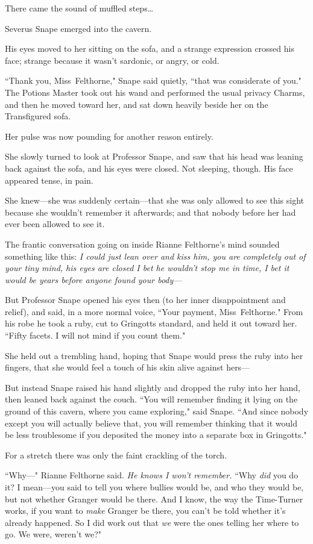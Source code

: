 There came the sound of muffled steps{\ldots}

Severus Snape emerged into the cavern.

His eyes moved to her sitting on the sofa, and a strange expression crossed his face; strange because it wasn't sardonic, or angry, or cold.

``Thank you, Miss~Felthorne," Snape said quietly, ``that was considerate of you." The Potions Master took out his wand and performed the usual privacy Charms, and then he moved toward her, and sat down heavily beside her on the Transfigured sofa.

Her pulse was now pounding for another reason entirely.

She slowly turned to look at Professor Snape, and saw that his head was leaning back against the sofa, and his eyes were closed. Not sleeping, though. His face appeared tense, in pain.

She knew—she was suddenly certain—that she was only allowed to see this sight because she wouldn't remember it afterwards; and that nobody before her had ever been allowed to see it.

The frantic conversation going on inside Rianne Felthorne's mind sounded something like this: \emph{I could just lean over and kiss him, you are completely out of your tiny mind, his eyes are closed I bet he wouldn't stop me in time, I bet it would be years before anyone found your body—}

But Professor Snape opened his eyes then (to her inner disappointment and relief), and said, in a more normal voice, ``Your payment, Miss~Felthorne." From his robe he took a ruby, cut to Gringotts standard, and held it out toward her. ``Fifty facets. I will not mind if you count them."

She held out a trembling hand, hoping that Snape would press the ruby into her fingers, that she would feel a touch of his skin alive against hers—

But instead Snape raised his hand slightly and dropped the ruby into her hand, then leaned back against the couch. ``You will remember finding it lying on the ground of this cavern, where you came exploring," said Snape. ``And since nobody except you will actually believe that, you will remember thinking that it would be less troublesome if you deposited the money into a separate box in Gringotts."

For a stretch there was only the faint crackling of the torch.

``Why—" Rianne Felthorne said. \emph{He knows I won't remember.} ``Why \emph{did} you do it? I mean—you said to tell you where bullies would be, and who they would be, but not whether Granger would be there. And I know, the way the Time-Turner works, if you want to \emph{make} Granger be there, you can't be told whether it's already happened. So I did work out that \emph{we} were the ones telling her where to go. We were, weren't we?"

